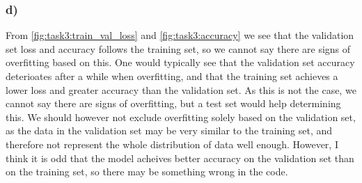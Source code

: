 \subsubsection*{d)}
From \cref{fig:task3:train_val_loss} and \cref{fig:task3:accuracy} we see that the validation set loss and accuracy follows the training set, so we cannot say there are signs of overfitting based on this. One would typically see that the validation set accuracy deterioates after a while when overfitting, and that the training set achieves a lower loss and greater accuracy than the validation set. As this is not the case, we cannot say there are signs of overfitting, but a test set would help determining this. We should however not exclude overfitting solely based on the validation set, as the data in the validation set may be very similar to the training set, and therefore not represent the whole distribution of data well enough. However, I think it is odd that the model acheives better accuracy on the validation set than on the training set, so there may be something wrong in the code.
